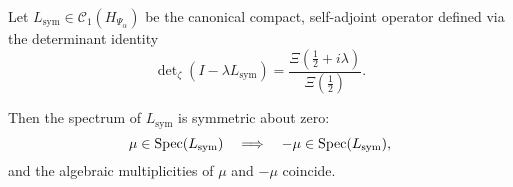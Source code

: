 \begin{lemma}
\label{lem:spectral_symmetry}
Let \( L_{\mathrm{sym}} \in \mathcal{C}_1(H_{\Psi_\alpha}) \) be the canonical compact, self-adjoint operator defined via the determinant identity
\[
\det\nolimits_\zeta(I - \lambda L_{\mathrm{sym}}) = \frac{\Xi(\tfrac{1}{2} + i\lambda)}{\Xi(\tfrac{1}{2})}.
\]

Then the spectrum of \( L_{\mathrm{sym}} \) is symmetric about zero:
\[
\mu \in \operatorname{Spec}(L_{\mathrm{sym}}) \quad \Longrightarrow \quad -\mu \in \operatorname{Spec}(L_{\mathrm{sym}}),
\]
and the algebraic multiplicities of \( \mu \) and \( -\mu \) coincide.
\end{lemma}
%  